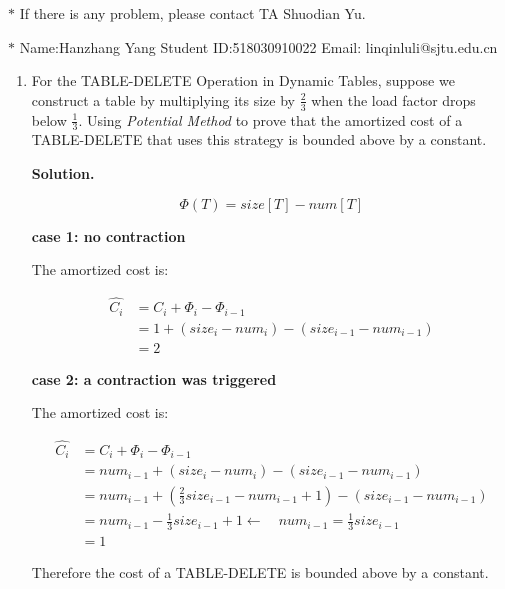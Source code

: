 \documentclass[12pt,a4paper]{article}
\theoremstyle{definition}
\begin{document}
\noindent

\noindent{}
\begin{center}
\footnotesize{\color{red}$*$ If there is any problem, please contact TA Shuodian Yu. }

\footnotesize{\color{blue}$*$ Name:Hanzhang Yang  \quad Student ID:518030910022 \quad Email: linqinluli@sjtu.edu.cn}
\end{center}
\begin{enumerate}
	\item For the TABLE-DELETE Operation in Dynamic Tables, suppose we construct a table by multiplying its size by $\frac 23$ when the load factor drops below $\frac 13$. Using \emph{Potential Method} to prove that the amortized cost of a TABLE-DELETE that uses this strategy is bounded above by a constant.
	
	\textbf{Solution.}
	
		$$\Phi(T)=size[T]-num[T]$$

	\textbf{case 1: no contraction}

	The amortized cost is:

	\begin{align*}  
		\hat{C_i} &= C_i+\Phi_i-\Phi_{i-1} \\  
	   &= 1+(size_i-num_i)-(size_{i-1}-num_{i-1})  \\  
	   &=2   
	  \end{align*} 

	\textbf{case 2: a contraction was triggered}

	The amortized cost is:

	\begin{align*}  
		\hat{C_i} &= C_i+\Phi_i-\Phi_{i-1} \\  
	   &= num_{i-1}+(size_i-num_i)-(size_{i-1}-num_{i-1})  \\  
	   &=num_{i-1}+(\frac{2}{3}size_{i-1}-num_{i-1}+1)-(size_{i-1}-num_{i-1})\\
	&=num_{i-1}-\frac{1}{3}size_{i-1}+1\leftarrow\quad num_{i-1}=\frac{1}{3}size_{i-1}\\
	&=1
	\end{align*} 

	Therefore the cost of a TABLE-DELETE is bounded above by a constant.


\end{enumerate}
\end{document}
